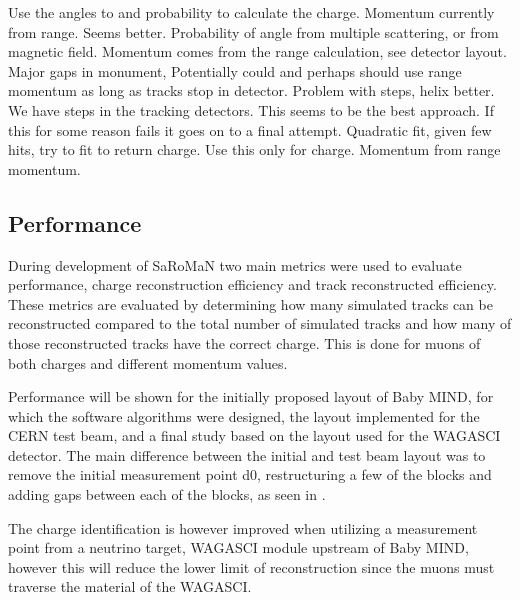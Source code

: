 Use the angles to and probability to calculate the charge. Momentum currently from range. Seems better.
Probability of angle from multiple scattering, or from magnetic field. 
Momentum comes from the range calculation, see detector layout. Major gaps in monument,  Potentially could and perhaps should use range momentum as long as tracks stop in detector. Problem with steps, helix better.
We have steps in the tracking detectors.
This seems to be the best approach. If this for some reason fails it goes on to a final attempt.
Quadratic fit, given few hits, try to fit to return charge. Use this only for charge. Momentum from range momentum.
\fi

\subsection{Performance}


During development of SaRoMaN two main metrics were used to evaluate performance, charge reconstruction efficiency and track reconstructed efficiency. These metrics are evaluated by determining how many simulated tracks can be reconstructed compared to the total number of simulated tracks and how many of those reconstructed tracks have the correct charge. This is done for muons of both charges and different momentum values.

Performance will be shown for the initially proposed layout of Baby MIND, for which the software algorithms were designed, the layout implemented for the CERN test beam, and a final study based on the layout used for the WAGASCI detector. The main difference between the initial and test beam layout was to remove the initial measurement point d0, restructuring a few of the blocks and adding gaps between each of the blocks, as seen in . %

The charge identification is however improved when utilizing a measurement point from a neutrino target, WAGASCI module upstream of Baby MIND, however this will reduce the lower limit of reconstruction since the muons must traverse the material of the WAGASCI. 

